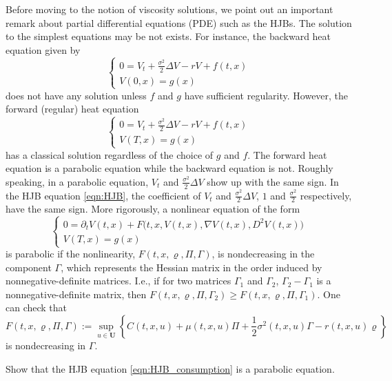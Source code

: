 \documentclass[11pt]{book}
\begin{document}
Before moving to the notion of viscosity solutions, we point out an important remark about partial differential equations (PDE) such as the HJBs. The solution to the simplest equations may be not exists. For instance, the backward heat equation given by
\begin{equation}
\begin{cases}
0={V}_{t}+\frac{\sigma^2}{2}\Delta V-rV+f(t,x)\\
V(0,x)=g(x)
\end{cases}
\end{equation}
does not have any solution unless $f$ and $g$ have sufficient regularity. However, the forward (regular) heat equation
\begin{equation}
\begin{cases}
0={V}_{t}+\frac{\sigma^2}{2}\Delta V-rV+f(t,x)\\
V(T,x)=g(x)
\end{cases}
\end{equation}
has a classical solution regardless of the choice of $g$ and $f$. The forward heat equation is a parabolic equation while the backward equation is not. Roughly speaking, in a parabolic equation, ${V}_{t}$ and $\frac{\sigma^2}{2}\Delta V$ show up with the same sign. In the HJB equation \eqref{eqn:HJB}, the coefficient of ${V}_{t}$ and $\frac{\sigma^2}{2}\Delta V$, $1$ and $\frac{\sigma^2}{2}$ respectively, have the same sign. More rigorously, a nonlinear equation of the form 
\begin{equation}\label{eqn:nonlinear_parabolic}
\begin{cases}
		0=\partial_{t}V(t,x)+F\big(t,x,V(t,x),\nabla V(t,x),D^2V(t,x)\big)\\
		V(T,x)=g(x)
\end{cases}
\end{equation}
is parabolic if the nonlinearity, $F(t,x,\varrho,\Pi,\Gamma)$, is nondecreasing in the component $\Gamma$, which represents the Hessian matrix in the order induced by nonnegative-definite matrices. I.e., if for two matrices $\Gamma_1$ and $\Gamma_2$, $\Gamma_2-\Gamma_1$ is a nonnegative-definite matrix, then $F(t,x,\varrho,\Pi,\Gamma_2)\ge F(t,x,\varrho,\Pi,\Gamma_1)$.
One can check that 
\begin{equation}
F(t,x,\varrho,\Pi,\Gamma):=\sup_{u\in \mathbf{U}}\left\{C(t,x,u)+\mu(t,x,u)\Pi+\frac12{\sigma^2(t,x,u)}\Gamma -r(t,x,u)\varrho\right\}
\end{equation}
is nondecreasing in $\Gamma$.

\begin{eg}
Show that the HJB equation \eqref{eqn:HJB_consumption} is a parabolic equation.
\end{eg}
\end{document}
